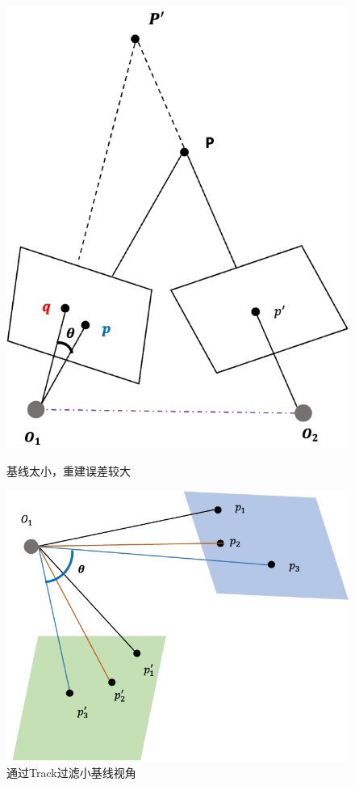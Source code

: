 	\begin{figure}[H]
		\begin{minipage}[t]{0.48\linewidth}
			\centering
			\includegraphics[width=\textwidth]{images/baseline_error.png}
			\caption{基线太小，重建误差较大}
		\end{minipage}		
		\begin{minipage}[t]{0.52\linewidth}
			\centering
			\includegraphics[width=\textwidth]{images/track_filter.png}
			\caption{通过Track过滤小基线视角}
		\end{minipage}			
	\end{figure}

